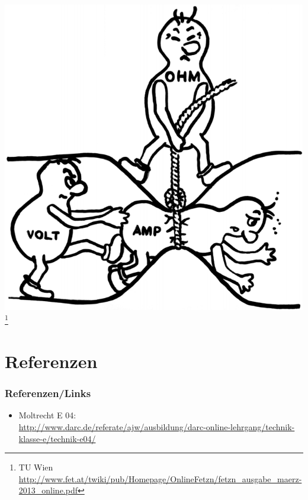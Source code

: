 \begin{frame}

	\begin{center}
        \includegraphics[width=.8\textwidth]{e04/URI.png}
        \footnote{\tiny TU Wien \url{http://www.fet.at/twiki/pub/Homepage/OnlineFetzn/fetzn_ausgabe_maerz-2013_online.pdf}}
    \end{center}
    
\end{frame}

\section*{Referenzen}

\begin{frame}
    \frametitle{Referenzen/Links}
    
    \footnotesize
    \begin{itemize}
        \item Moltrecht E 04: \\
              \url{http://www.darc.de/referate/ajw/ausbildung/darc-online-lehrgang/technik-klasse-e/technik-e04/}
    \end{itemize}

\end{frame}


